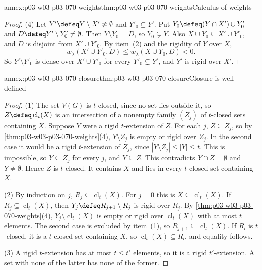 \begin{annexitem}{annex:p03-w03-p03-070-weights}{thm:p03-w03-p03-070-weights}{Calculus of weights}
\begin{proof}
(4) Let \(Y'\defeq Y\setminus X'\neq\emptyset\) and \(Y'_0\subsetneq Y'\).  Put
\(Y_0\defeq(Y\cap X')\cup Y'_0\) and \(D\defeq Y'\setminus Y'_0\neq\emptyset\).
Then \(Y\setminus Y_0=D\), so \(Y_0\subsetneq Y\).  Also
\(X\cup Y_0\subseteq X'\cup Y'_0\), and \(D\) is disjoint from
\(X'\cup Y'_0\).  By item~(2) and the rigidity of \(Y\) over \(X\),
\[
 w_\lambda(X'\cup Y'_0,D)\leq w_\lambda(X\cup Y_0,D)<0 .
\]
So \(Y'\setminus Y'_0\) is dense over \(X'\cup Y'_0\) for every
\(Y'_0\subsetneq Y'\), and \(Y'\) is rigid over \(X'\).
\end{proof}
\end{annexitem}

\begin{annexitem}{annex:p03-w03-p03-070-closure}{thm:p03-w03-p03-070-closure}{Closure is well defined}
\begin{proof}
(1) The set \(V(G)\) is \(t\)-closed, since no set lies outside it, so
\(Z\defeq\operatorname{cl}_t(X)\) is an intersection of a nonempty family
\((Z_j)\) of \(t\)-closed sets containing \(X\).  Suppose \(Y\) were a rigid
\(t\)-extension of \(Z\).  For each \(j\), \(Z\subseteq Z_j\), so by
\cref{thm:p03-w03-p03-070-weights}(4), \(Y\setminus Z_j\) is empty or rigid
over \(Z_j\).  In the second case it would be a rigid \(t\)-extension of
\(Z_j\), since \(|Y\setminus Z_j|\leq|Y|\leq t\).  This is impossible, so
\(Y\subseteq Z_j\) for every \(j\), and \(Y\subseteq Z\).  This contradicts
\(Y\cap Z=\emptyset\) and \(Y\neq\emptyset\).  Hence \(Z\) is \(t\)-closed.
It contains \(X\) and lies in every \(t\)-closed set containing \(X\).

(2) By induction on \(j\), \(R_j\subseteq\operatorname{cl}_t(X)\).  For
\(j=0\) this is \(X\subseteq\operatorname{cl}_t(X)\).  If
\(R_j\subseteq\operatorname{cl}_t(X)\), then \(Y_j\defeq R_{j+1}\setminus R_j\)
is rigid over \(R_j\).  By \cref{thm:p03-w03-p03-070-weights}(4),
\(Y_j\setminus\operatorname{cl}_t(X)\) is empty or rigid over
\(\operatorname{cl}_t(X)\) with at most \(t\) elements.  The second case is
excluded by item~(1), so \(R_{j+1}\subseteq\operatorname{cl}_t(X)\).  If
\(R_l\) is \(t\)-closed, it is a \(t\)-closed set containing \(X\), so
\(\operatorname{cl}_t(X)\subseteq R_l\), and equality follows.

(3) A rigid \(t\)-extension has at most \(t\leq t'\) elements, so it is a
rigid \(t'\)-extension.  A set with none of the latter has none of the former.


\end{proof}
\end{annexitem}
